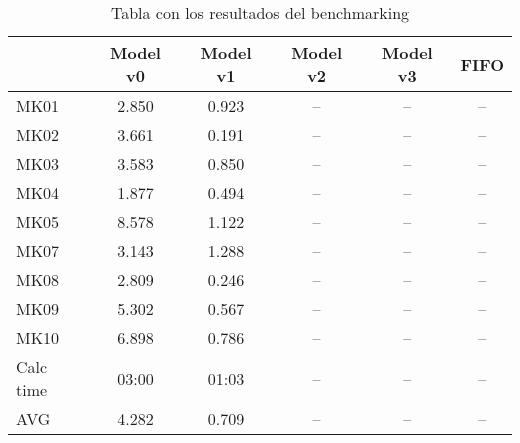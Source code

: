     \begin{table}[ht]
        \centering
        \begin{tabular}[t]{|lcccc|c|}
            \hline
            & Model v0 & Model v1 & Model v2 & Model v3 & FIFO \\
            \hline
            MK01  & 2.850 & 0.923 & -- & -- & -- \\
            MK02  & 3.661 & 0.191 & -- & -- & -- \\
            MK03  & 3.583 & 0.850 & -- & -- & -- \\
            MK04  & 1.877 & 0.494 & -- & -- & -- \\
            MK05  & 8.578 & 1.122 & -- & -- & -- \\
            MK07  & 3.143 & 1.288 & -- & -- & -- \\
            MK08  & 2.809 & 0.246 & -- & -- & -- \\
            MK09  & 5.302 & 0.567 & -- & -- & -- \\
            MK10  & 6.898 & 0.786 & -- & -- & -- \\
            \hline
            Calc time & 03:00 & 01:03 & -- & -- & -- \\
            AVG       & 4.282 & 0.709 & -- & -- & -- \\
            \hline
        \end{tabular}
        \caption{Tabla con los resultados del benchmarking}
    \end{table} 


\pagebreak